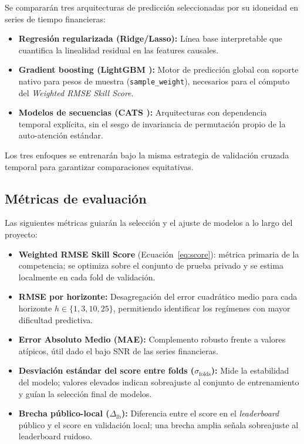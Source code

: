 \documentclass{article}
\begin{document}
Se compararán tres arquitecturas de predicción seleccionadas por su idoneidad en series de tiempo financieras:

\begin{itemize}
    \item \textbf{Regresión regularizada (Ridge/Lasso):} Línea base interpretable que cuantifica la linealidad residual en las features causales.
    \item \textbf{Gradient boosting (LightGBM \citep{ke2017lightgbm}):} Motor de predicción global con soporte nativo para pesos de muestra (\texttt{sample\_weight}), necesarios para el cómputo del \emph{Weighted RMSE Skill Score}.
    \item \textbf{Modelos de secuencias (CATS \citep{kim2024cats}):} Arquitecturas con dependencia temporal explícita, sin el sesgo de invariancia de permutación propio de la auto-atención estándar.
\end{itemize}

Los tres enfoques se entrenarán bajo la misma estrategia de validación cruzada temporal para garantizar comparaciones equitativas.

\subsection{Métricas de evaluación}

Las siguientes métricas guiarán la selección y el ajuste de modelos a lo largo del proyecto:

\begin{itemize}
    \item \textbf{Weighted RMSE Skill Score} (Ecuación~\ref{eq:score}): métrica primaria de la competencia; se optimiza sobre el conjunto de prueba privado y se estima localmente en cada fold de validación.
    \item \textbf{RMSE por horizonte:} Desagregación del error cuadrático medio para cada horizonte $h \in \{1, 3, 10, 25\}$, permitiendo identificar los regímenes con mayor dificultad predictiva.
    \item \textbf{Error Absoluto Medio (MAE):} Complemento robusto frente a valores atípicos, útil dado el bajo SNR de las series financieras.
    \item \textbf{Desviación estándar del score entre folds ($\sigma_{\text{folds}}$):} Mide la estabilidad del modelo; valores elevados indican sobreajuste al conjunto de entrenamiento y guían la selección final de modelos.
    \item \textbf{Brecha público-local ($\Delta_{\text{lb}}$):} Diferencia entre el score en el \emph{leaderboard} público y el score en validación local; una brecha amplia señala sobreajuste al leaderboard ruidoso.
\end{itemize}
\end{document}
